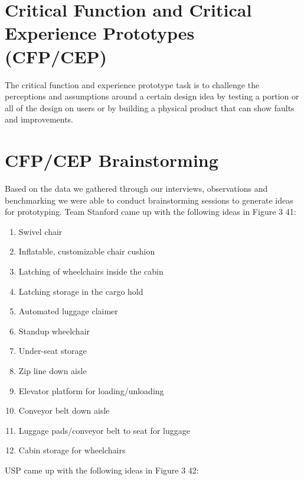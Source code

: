 \documentclass[a4paper, 12pt,conference]{new_cit_thesis}
\begin{document}
\section*{Critical Function and Critical Experience Prototypes (CFP/CEP)}
The critical function and experience prototype task is to challenge the perceptions and assumptions around a certain design idea by testing a portion or all of the design on users or by building a physical product that can show faults and improvements.  

\section{CFP/CEP Brainstorming}

Based on the data we gathered through our interviews, observations and benchmarking we were able to conduct brainstorming sessions to generate ideas for prototyping. Team Stanford came up with the following ideas in Figure 3 41:
\begin{enumerate}
 \item{Swivel chair}
 \item{Inflatable, customizable chair cushion}
 \item{Latching of wheelchairs inside the cabin}
 \item{Latching storage in the cargo hold}
 \item{Automated luggage claimer}
 \item{Standup wheelchair}
 \item{Under-seat storage}
 \item{Zip line down aisle}
 \item{Elevator platform for loading/unloading}
 \item{Conveyor belt down aisle}
 \item{Luggage pads/conveyor belt to seat for luggage}
 \item{Cabin storage for wheelchairs}
\end{enumerate}
USP came up with the following ideas in Figure 3 42:
\end{document}
